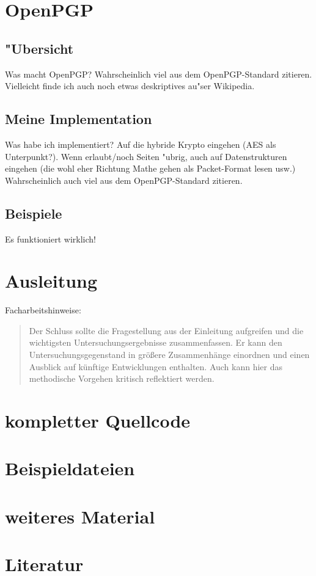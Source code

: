 \documentclass[12pt]{article}
\begin{document}
\section{OpenPGP}
\subsection{"Ubersicht}
Was macht OpenPGP?
Wahrscheinlich viel aus dem OpenPGP-Standard zitieren. Vielleicht finde ich auch noch etwas deskriptives au"ser Wikipedia.
\subsection{Meine Implementation}
Was habe ich implementiert? Auf die hybride Krypto eingehen (AES als Unterpunkt?). Wenn erlaubt/noch Seiten "ubrig, auch auf Datenstrukturen eingehen (die wohl eher Richtung Mathe gehen als Packet-Format lesen usw.)
Wahrscheinlich auch viel aus dem OpenPGP-Standard zitieren.
\subsection{Beispiele}
Es funktioniert wirklich!

\section{Ausleitung}
Facharbeitshinweise:
\begin{quote}
Der Schluss sollte die Fragestellung aus der Einleitung aufgreifen und die wichtigsten Untersuchungsergebnisse zusammenfassen. Er kann den Untersuchungsgegenstand in größere Zusammenhänge einordnen und einen Ausblick auf künftige Entwicklungen enthalten. Auch kann hier das methodische Vorgehen kritisch reflektiert werden.
\end{quote}

\appendix

\section{kompletter Quellcode}

\section{Beispieldateien}

\section{weiteres Material}

\section{Literatur}

\renewcommand{\section}[2]{}

\end{document}
